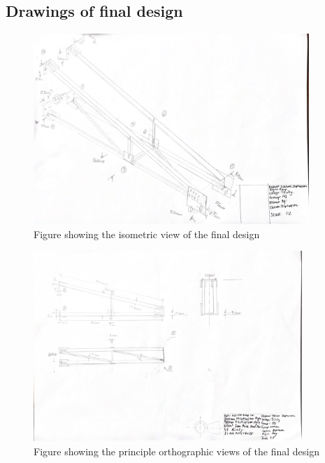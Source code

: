 \documentclass[12pt]{article}
\begin{document}
            \subsection{Drawings of final design}
            \begin{figure}[H]
                \begin{center}
                \captionsetup{labelfont=bf}
                \captionsetup{justification=centering}
                \includegraphics[height=17pc]{drawing_iso.png}
                \caption{Figure showing the isometric view of the final design}
                \end{center}
            \end{figure}
            \begin{figure}[H]
                \begin{center}
                \captionsetup{labelfont=bf}
                \captionsetup{justification=centering}
                \includegraphics[height=17pc]{drawing_ortho.png}
                \caption{Figure showing the principle orthographic views of the final design}
                \end{center}
            \end{figure}
\end{document}

